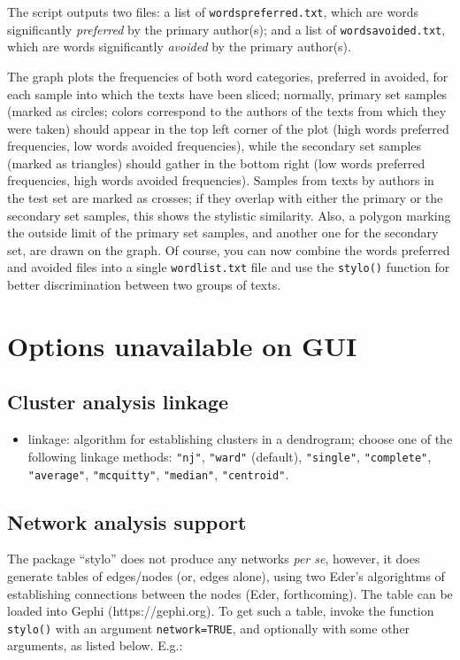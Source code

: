 \documentclass[11pt,a4paper]{article}
\def\underscore{\raisebox{-.8ex}{-}}
\def\margin#1{\marginpar{\textcolor{blue}{\footnotesize\tt #1}}}
\def\code#1{{\tt #1}}
\begin{document}
The script outputs two files: a list of \code{words\underscore{}preferred.txt},
which are words significantly \textit{preferred} by the primary author(s);
and a list of \code{words\underscore{}avoided.txt}, which are
words significantly \textit{avoided} by the primary author(s).

The graph plots the frequencies of both word categories, preferred
in avoided, for each sample into which the texts have been sliced;
normally, primary set samples (marked as circles; colors correspond
to the authors of the texts from which they were taken) should appear
in the top left corner of the plot (high words preferred frequencies,
low words avoided frequencies), while the secondary set samples (marked
as triangles) should gather in the bottom right (low words preferred
frequencies, high words avoided frequencies). Samples from texts by
authors in the test set are marked as crosses; if they overlap with
either the primary or the secondary set samples, this shows the stylistic
similarity. Also, a polygon marking the outside limit of the primary
set samples, and another one for the secondary set, are drawn on the
graph. Of course, you can now combine the words preferred and avoided 
files into a single \code{wordlist.txt} file and use the \code{stylo()} 
function for better discrimination between two groups of texts.

\section{Options unavailable on GUI}

\subsection{Cluster analysis linkage}

\begin{itemize}
\item linkage:\margin{linkage=} algorithm for establishing clusters in a dendrogram;  choose one of the following linkage methods: \code{"nj"}, \code{"ward"} (default), \code{"single"}, \code{"complete"}, \code{"average"},  \code{"mcquitty"}, \code{"median"}, \code{"centroid"}.
\end{itemize}

\subsection{Network analysis support}

The package ``stylo'' does not produce any networks {\it per se}, however, 
it does generate tables of edges/nodes (or, edges alone), using two Eder's 
algorightms of establishing connections between the nodes (Eder, forthcoming). 
The table can be loaded into Gephi (https://gephi.org). To get such a table, 
invoke the function \code{stylo()} with an argument \code{network=TRUE}, 
and optionally with some other arguments, as listed below. E.g.:
\end{document}
